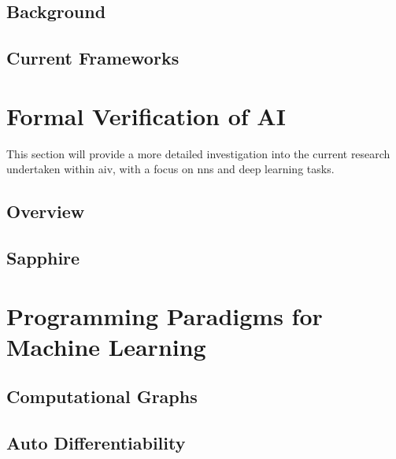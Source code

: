 \subsection{Background}


\subsection{Current Frameworks}


\section{Formal Verification of AI}

This section will provide a more detailed investigation into the current research
undertaken within \gls{aiv}, with a focus on \glspl{nn} and deep learning tasks.

\subsection{Overview}

\subsection{Sapphire}


\section{Programming Paradigms for Machine Learning}

\subsection{Computational Graphs}
\subsection{Auto Differentiability}

